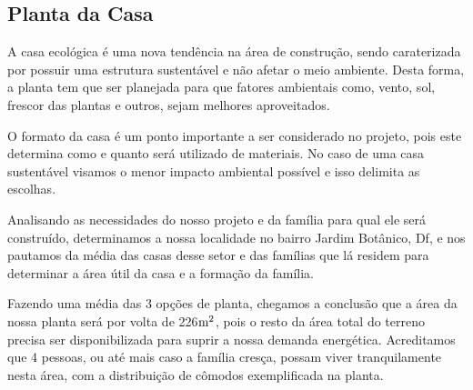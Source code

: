 \subsection{Planta da Casa}
	
	A casa ecológica é uma nova tendência na área de construção, sendo caraterizada por possuir uma estrutura sustentável e não afetar o meio ambiente. Desta forma, a planta tem que ser planejada para que fatores ambientais como, vento, sol, frescor das plantas e outros, sejam melhores aproveitados. 

	O formato da casa é um ponto importante a ser considerado no projeto, pois este determina como e quanto será utilizado de materiais. No caso de uma casa sustentável visamos o menor impacto ambiental possível e isso delimita as escolhas.

	Analisando as necessidades do nosso projeto e da família para qual ele será construído, determinamos a nossa localidade no bairro Jardim Botânico, Df, e nos pautamos da média das casas desse setor e das famílias que lá residem para determinar a área útil da casa e a formação da família.

	Fazendo uma média das 3 opções de planta, chegamos a conclusão que a área da nossa planta será por volta de 226$\textup{m}^{2}$, pois o resto da área total do terreno precisa ser disponibilizada para suprir a nossa demanda energética. Acreditamos que 4 pessoas, ou até mais caso a família cresça, possam viver tranquilamente nesta área, com a distribuição de cômodos exemplificada na planta. 

